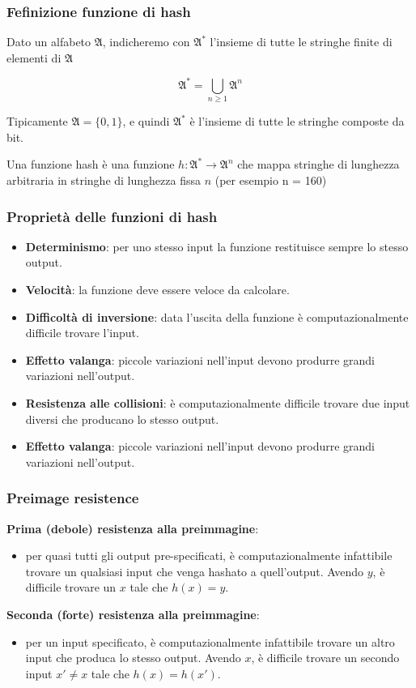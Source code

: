 \begin{frame}
	\frametitle{Fefinizione funzione di hash}

	Dato un alfabeto $\mathfrak{A}$, indicheremo con $\mathfrak{A}^*$ l’insieme di tutte le stringhe finite di elementi di $\mathfrak{A}$

	\[
		\mathfrak{A}^* = \bigcup_{n \geq 1} \mathfrak{A}^n
	\]

	Tipicamente $\mathfrak{A} = \{0, 1\}$, e quindi $\mathfrak{A}^*$ è l’insieme di tutte le stringhe composte da bit.

	\vspace{1cm}
	Una funzione hash è una funzione $h : \mathfrak{A}^* \rightarrow \mathfrak{A}^n$ che mappa stringhe di lunghezza arbitraria in stringhe di lunghezza fissa $n$ (per esempio n = 160)

\end{frame}


\begin{frame}
	\frametitle{Proprietà delle funzioni di hash}

	\begin{itemize}
		\item \textbf{Determinismo}: per uno stesso input la funzione restituisce sempre lo stesso output.
		\item \textbf{Velocità}: la funzione deve essere veloce da calcolare.
		\item \textbf{Difficoltà di inversione}: data l'uscita della funzione è computazionalmente difficile trovare l'input.
		\item \textbf{Effetto valanga}: piccole variazioni nell'input devono produrre grandi variazioni nell'output.
		\item \textbf{Resistenza alle collisioni}: è computazionalmente difficile trovare due input diversi che producano lo stesso output.
		\item \textbf{Effetto valanga}: piccole variazioni nell'input devono produrre grandi variazioni nell'output.
	\end{itemize}
\end{frame}

\begin{frame}
	\frametitle{Preimage resistence}
	\textbf{Prima (debole) resistenza alla preimmagine}:
	\begin{itemize}
		\item per quasi tutti gli output pre-specificati, è computazionalmente infattibile trovare un qualsiasi input che venga hashato a quell'output.
		      Avendo \( y \), è difficile trovare un \( x \) tale che \( h(x) = y \).
	\end{itemize}
	\textbf{Seconda (forte) resistenza alla preimmagine}:
	\begin{itemize}
		\item per un input specificato, è computazionalmente infattibile trovare un altro input che produca lo stesso output.
		      Avendo \( x \), è difficile trovare un secondo input \( x' \neq x \) tale che \( h(x) = h(x') \).
	\end{itemize}

\end{frame}

